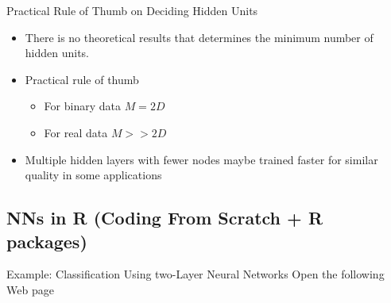 \documentclass[10pt, hyperref={colorlinks = true,linkcolor = blue}]{beamer}
\begin{document}
{{{\begin{frame}{Practical Rule of Thumb on Deciding Hidden Units}
\begin{itemize}
\item There is no theoretical results that determines the  minimum number of hidden units.
\item Practical rule of thumb 
\begin{itemize}
\item For binary data $M=2D$
\item For real data $M>>2D$ 
\end{itemize}
\item Multiple hidden layers with fewer nodes maybe trained faster for similar quality in some applications 
\end{itemize}
\end{frame}

}

{\subsection{NNs in R (Coding From Scratch + R packages)}
\begin{frame}{Example: Classification Using two-Layer Neural Networks} 
Open the following Web page  
\end{frame}
}


}

}
\end{document}
